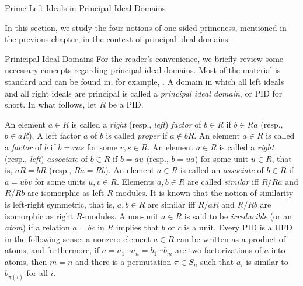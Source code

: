 \documentclass[11pt,a4paper]{article}
\theoremstyle{theorem}
\numberwithin{equation}{section}
\begin{document}
\begin{section}{Prime Left Ideals in Principal Ideal Domains}\label{sec: primness for PID}
	 
	 In this section, we study the four notions of one-sided primeness, mentioned in the previous chapter, in the context of principal ideal domains. 
	 
\begin{subsection}{Prinicipal Ideal Domains} 
	 For the reader’s convenience, we briefly review some necessary concepts regarding principal ideal domains. Most of the material is standard and can be found in, for example, \cite{cohn2006free}. A domain in which all left ideals and all right ideals are principal is called a \textit{principal ideal domain}, or PID for short. In what follows, let \(R\) be a PID. 
	 
	 An element \(a\in R\) is called a \textit{right }(resp., \textit{left}) \textit{factor} of \(b\in R\) if \(b\in Ra\) (resp., \(b\in aR\)).  A left factor \(a\) of \(b\) is called \textit{proper} if \(a\notin bR\). An element \(a\in R\) is called a  \textit{factor} of \(b\) if \(b = ras \) for some \(r,s              \in R\).  An element \(a\in R\) is called a
	 \textit{right }(resp., \textit{left}) \textit{associate} of \(b\in R\) if \(b = au\) (resp., \(b = ua\)) for some unit \(u\in R\), that is, \(aR = bR\) (resp., \(Ra = Rb\)). 
	 An element \(a\in R\) is called an \textit{associate} of \(b\in R\) if \(a = ubv\) for some units \(u,v\in R\).
	 Elements \(a,b\in R\) are called \textit{similar} iff \(R/Ra\) and \(R/Rb\) are isomorphic as left \(R\)-modules. It is known that the notion of similarity is left-right symmetric, that is, \(a,b\in R\) are similar iff \(R/aR\) and \(R/Rb\) are isomorphic as right \(R\)-modules.  A non-unit \(a\in R\) is said to be \textit{irreducible} (or an \textit{atom}) if a relation \(a = bc\) in \(R\) implies that \(b\) or \(c\) is a unit.	Every PID is a UFD in the following sense: a nonzero element \(a\in R\) can be written as a product of atoms, and furthermore,   if \(a=a_1\cdots a_n = b_1\cdots b_m\) are two factorizations of \(a\) into atoms, then \(m=n\) and there is a permutation \(\pi\in S_n\) such that \(a_i\) is similar to \(b_{\pi(i)}\) for all \(i\). 
	 

\end{subsection}
\end{section}
\end{document}
